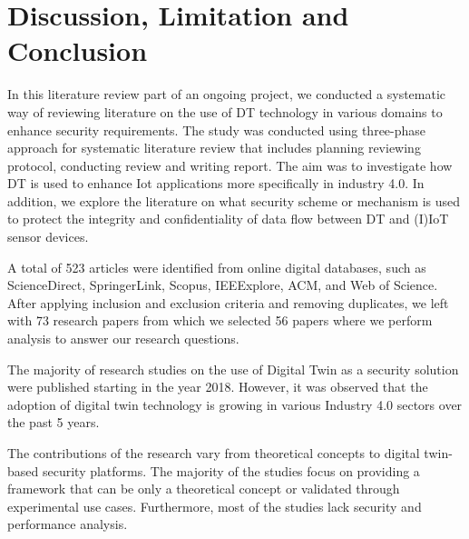 \chapter{Discussion, Limitation and Conclusion}
\label{Chapter4} %

In this literature review part of an ongoing project, we conducted a systematic way of reviewing literature on the use of DT technology in various domains to enhance security requirements. The study was conducted using three-phase approach for systematic literature review that includes planning reviewing protocol, conducting review and writing report. The aim was to investigate how DT is used to enhance Iot applications more specifically in industry 4.0. In addition, we explore the literature on what security scheme or mechanism is used to protect the integrity and confidentiality of data flow between DT and (I)IoT sensor devices.



A total of 523 articles were identified from online digital databases, such as ScienceDirect, SpringerLink, Scopus, IEEExplore, ACM, and Web of Science. After applying inclusion and exclusion criteria and removing duplicates, we left with 73 research papers from which we selected 56 papers where we perform analysis to answer our research questions.

The majority of research studies on the use of Digital Twin as a security solution were published starting in the year 2018. However, it was observed that the adoption of digital twin technology is growing in various Industry 4.0 sectors over the past 5 years. 

The contributions of the research vary from theoretical concepts to digital twin-based security platforms. The majority of the studies focus on providing a framework that can be only a theoretical concept or validated through experimental use cases. Furthermore, most of the studies lack security and performance analysis.

